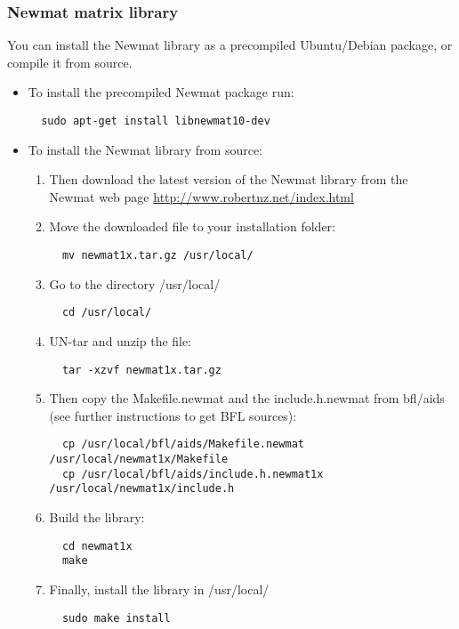 \documentclass[a4paper,10pt]{article}
\begin{document}
\subsubsection{Newmat matrix library}
You can install the Newmat library as a precompiled Ubuntu/Debian
package, or compile it from source.
\begin{itemize}
\item To install the precompiled Newmat package run:
\begin{verbatim}
  sudo apt-get install libnewmat10-dev
\end{verbatim}


\item To install the Newmat library from source:
\begin{enumerate}
\item Then download the latest version of the Newmat library from the
  Newmat web page
  \url{http://www.robertnz.net/index.html}
\item Move the downloaded file to your installation folder:
\begin{verbatim}
  mv newmat1x.tar.gz /usr/local/
\end{verbatim}
\item Go to the directory /usr/local/
\begin{verbatim}
  cd /usr/local/
\end{verbatim}
\item UN-tar and unzip the file:
\begin{verbatim}
  tar -xzvf newmat1x.tar.gz
\end{verbatim}
\item Then copy the Makefile.newmat and the include.h.newmat from
  bfl/aids (see further instructions to get BFL sources):
\begin{verbatim}
  cp /usr/local/bfl/aids/Makefile.newmat /usr/local/newmat1x/Makefile
  cp /usr/local/bfl/aids/include.h.newmat1x /usr/local/newmat1x/include.h
\end{verbatim}
\item Build the library:
\begin{verbatim}
  cd newmat1x
  make 
\end{verbatim}
\item Finally, install the library in /usr/local/
\begin{verbatim}
  sudo make install
\end{verbatim}
\end{enumerate}
\end{itemize}
\end{document}

